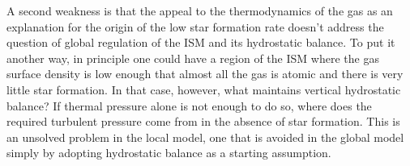 A second weakness is that the appeal to the thermodynamics of the gas as an explanation for the origin of the low star formation rate doesn't address the question of global regulation of the ISM and its hydrostatic balance. To put it another way, in principle one could have a region of the ISM where the gas surface density is low enough that almost all the gas is atomic and there is very little star formation. In that case, however, what maintains vertical hydrostatic balance? If thermal pressure alone is not enough to do so, where does the required turbulent pressure come from in the absence of star formation. This is an unsolved problem in the local model, one that is avoided in the global model simply by adopting hydrostatic balance as a starting assumption.

